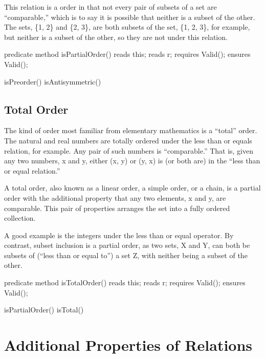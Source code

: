 \documentclass[letterpaper,10pt,english]{sphinxmanual}
\begin{document}
This relation is a  order in that not every pair of subsets
of a set are “comparable,” which is to say it is possible that neither
is a subset of the other. The sets, \{1, 2\} and \{2, 3\}, are both
subsets of the set, \{1, 2, 3\}, for example, but neither is a subset of
the other, so they are not  under this relation.

\begin{sphinxVerbatim}[commandchars=\\\{\}]
predicate method isPartialOrder()
    reads this;
    reads r;
    requires Valid();
    ensures Valid();

\PYGZob{}
    isPreorder() \PYGZam{}\PYGZam{} isAntisymmetric()
\PYGZcb{}
\end{sphinxVerbatim}


\subsection{Total Order}
\label{\detokenize{08-relations:total-order}}
The kind of order most familiar from elementary mathematics is a
“total” order. The natural and real numbers are totally ordered under
the less than or equals relation, for example. Any pair of such
numbers is “comparable.” That is, given any two numbers, x and y,
either (x, y) or (y, x) is (or both are) in the “less than or equal
relation.”

A total order, also known as a linear order, a simple order, or a
chain, is a partial order with the additional property that any two
elements, x and y, are comparable. This pair of properties arranges
the set into a fully ordered collection.

A good example is the integers under the less than or equal
operator. By contrast, subset inclusion is a partial order, as two
sets, X and Y, can both be subsets of (“less than or equal to”) a set
Z, with neither being a subset of the other.

\begin{sphinxVerbatim}[commandchars=\\\{\}]
predicate method isTotalOrder()
    reads this;
    reads r;
    requires Valid();
    ensures Valid();

\PYGZob{}
    isPartialOrder() \PYGZam{}\PYGZam{} isTotal()
\PYGZcb{}
\end{sphinxVerbatim}


\section{Additional Properties of Relations}
\label{\detokenize{08-relations:additional-properties-of-relations}}
\end{document}
